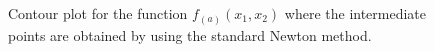 \documentclass[a4paper,11pt]{article}
\begin{document}
	\begin{figure}[H]
		\centering
		\caption{Contour plot for the function $f_{(a)}(x_{1},x_{2})$ where the intermediate points are obtained by using the standard Newton method.}
		\label{Fig:func_a_Contour}
	\end{figure}
\end{document}
